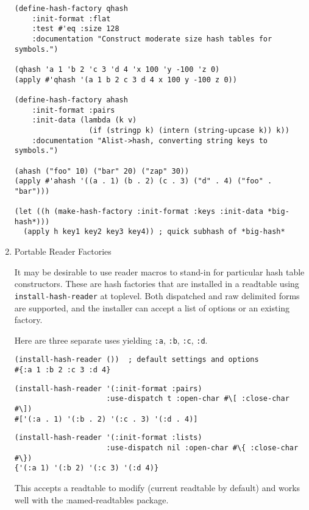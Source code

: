 \documentclass[11pt]{article}
\begin{document}
\begin{enumerate}
\begin{verbatim}
(define-hash-factory qhash
    :init-format :flat
    :test #'eq :size 128
    :documentation "Construct moderate size hash tables for symbols.")

(qhash 'a 1 'b 2 'c 3 'd 4 'x 100 'y -100 'z 0)
(apply #'qhash '(a 1 b 2 c 3 d 4 x 100 y -100 z 0))

(define-hash-factory ahash
    :init-format :pairs
    :init-data (lambda (k v)
                 (if (stringp k) (intern (string-upcase k)) k))
    :documentation "Alist->hash, converting string keys to symbols.")

(ahash ("foo" 10) ("bar" 20) ("zap" 30))
(apply #'ahash '((a . 1) (b . 2) (c . 3) ("d" . 4) ("foo" . "bar")))

(let ((h (make-hash-factory :init-format :keys :init-data *big-hash*)))
  (apply h key1 key2 key3 key4)) ; quick subhash of *big-hash*
\end{verbatim}
\item Portable Reader Factories

     It may be desirable to use reader macros to stand-in for particular
     hash table constructors. These are hash factories that are installed in
     a readtable using \texttt{install-hash-reader} at toplevel. Both dispatched
     and raw delimited forms are supported, and the installer can accept a
     list of options or an existing factory.

     Here are three separate uses yielding \texttt{:a}, \texttt{:b}, \texttt{:c}, \texttt{:d}.
  

\begin{verbatim}
(install-hash-reader ())  ; default settings and options
#{:a 1 :b 2 :c 3 :d 4}
\end{verbatim}



              

\begin{verbatim}
(install-hash-reader '(:init-format :pairs)
                     :use-dispatch t :open-char #\[ :close-char #\])
#['(:a . 1) '(:b . 2) '(:c . 3) '(:d . 4)]
\end{verbatim}



              

\begin{verbatim}
(install-hash-reader '(:init-format :lists)
                     :use-dispatch nil :open-char #\{ :close-char #\})
{'(:a 1) '(:b 2) '(:c 3) '(:d 4)}
\end{verbatim}




     This accepts a readtable to modify (current readtable by default) and works
     well with the :named-readtables package.
\end{enumerate}
\end{document}
